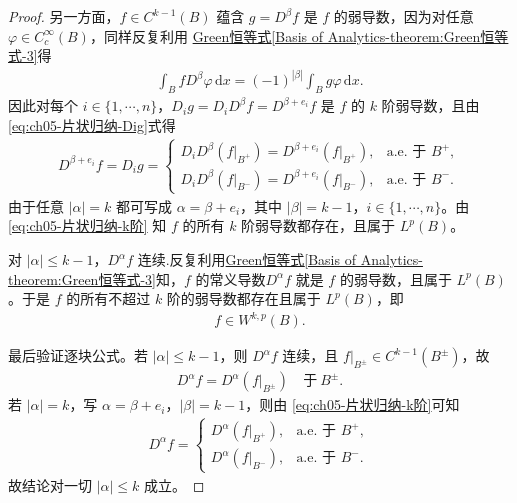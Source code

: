 \documentclass[../../main.tex]{subfiles}
\begin{document}
\begin{proof}
另一方面，$f\in C^{k-1}(B)$ 蕴含 $g=D^{\beta}f$ 是 $f$ 的弱导数，因为对任意 $\varphi\in C_{c}^{\infty}(B)$，同样反复利用
\hyperref[Basis of Analytics-theorem:Green恒等式-3]{Green恒等式\ref{Basis of Analytics-theorem:Green恒等式-3}}得
\begin{align*}
\int_{B}fD^{\beta}\varphi\,\mathrm{d}x
=(-1)^{|\beta|}\int_{B}g\varphi\,\mathrm{d}x.
\end{align*}
因此对每个 $i\in\{1,\cdots,n\}$，$D_{i}g=D_{i}D^{\beta}f=D^{\beta+e_i}f$ 是 $f$ 的 $k$ 阶弱导数，且由 \eqref{eq:ch05-片状归纳-Dig}式得
\begin{align}
D^{\beta+e_i}f
=D_{i}g
=
\begin{cases}
D_{i}D^{\beta}(f|_{B^{+}})=D^{\beta+e_i}(f|_{B^{+}}), & \text{a.e. 于 }B^{+},\\
D_{i}D^{\beta}(f|_{B^{-}})=D^{\beta+e_i}(f|_{B^{-}}), & \text{a.e. 于 }B^{-}.
\end{cases}
\label{eq:ch05-片状归纳-k阶}
\end{align}
由于任意 $|\alpha|=k$ 都可写成 $\alpha=\beta+e_i$，其中 $|\beta|=k-1$，$i\in\{1,\cdots,n\}$。由 \eqref{eq:ch05-片状归纳-k阶} 知 $f$ 的所有 $k$ 阶弱导数都存在，且属于 $L^{p}(B)$。

对 $|\alpha|\leqslant k-1$，$D^{\alpha}f$ 连续.反复利用\hyperref[Basis of Analytics-theorem:Green恒等式-3]{Green恒等式\ref{Basis of Analytics-theorem:Green恒等式-3}}知，$f$ 的常义导数$D^{\alpha}f$ 就是 $f$ 的弱导数，且属于 $L^{p}(B)$。于是 $f$ 的所有不超过 $k$ 阶的弱导数都存在且属于 $L^{p}(B)$，即
\begin{align*}
f\in W^{k,p}(B).
\end{align*}

最后验证逐块公式。若 $|\alpha|\leqslant k-1$，则 $D^{\alpha}f$ 连续，且 $f|_{B^{\pm}}\in C^{k-1}(B^{\pm})$，故
\begin{align*}
D^{\alpha}f=D^{\alpha}(f|_{B^{\pm}})\quad\text{于}\ B^{\pm}.
\end{align*}
若 $|\alpha|=k$，写 $\alpha=\beta+e_i$，$|\beta|=k-1$，则由 \eqref{eq:ch05-片状归纳-k阶}可知
\begin{align*}
D^{\alpha}f=
\begin{cases}
D^{\alpha}(f|_{B^{+}}), & \text{a.e. 于 }B^{+},\\
D^{\alpha}(f|_{B^{-}}), & \text{a.e. 于 }B^{-}.
\end{cases}
\end{align*}
故结论对一切 $|\alpha|\leqslant k$ 成立。
\end{proof}
\end{document}
